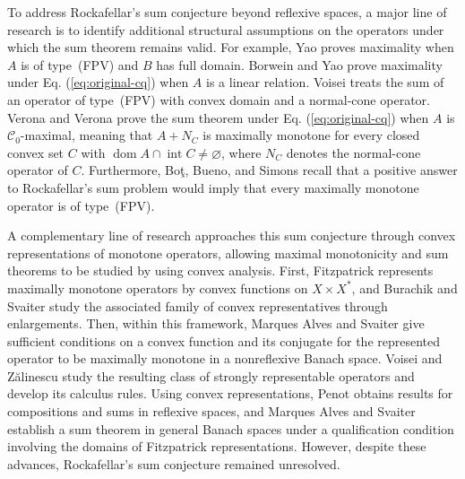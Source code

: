 \documentclass[11pt]{article}
\newcommand{\dom}{\operatorname{dom}}
\theoremstyle{definition}
\theoremstyle{remark}
\begin{document}






To address Rockafellar's sum conjecture beyond reflexive spaces, a major line of research is to identify additional structural assumptions on the operators under which the sum theorem remains valid. 
For example, Yao \cite{yao2010} proves maximality when $A$ is of type~(FPV) and $B$ has full domain. Borwein and Yao \cite{borweinyao2012} prove maximality under Eq. (\ref{eq:original-cq}) when $A$ is a linear relation. Voisei \cite{voisei2010} treats the sum of an operator of type~(FPV) with convex domain and a normal-cone operator. Verona and Verona \cite{veronaverona2022} prove the sum theorem under Eq. (\ref{eq:original-cq}) when $A$ is $\mathcal C_0$-maximal, meaning that  $A+N_C$ is maximally monotone for every closed convex set $C$ with $\dom A\cap\operatorname{int}C\ne\varnothing$, where $N_C$ denotes the normal-cone operator of $C$. 
Furthermore, Bo\c{t}, Bueno, and Simons \cite{botbuenosimons2016} recall that a positive answer to Rockafellar's sum problem would imply that every maximally monotone operator is of type~(FPV). 




A complementary line of research approaches this sum conjecture through convex representations of monotone operators, allowing maximal monotonicity and sum theorems to be studied by using convex analysis. First, Fitzpatrick \cite{fitzpatrick1988} represents maximally monotone operators by convex functions on $X\times X^*$, and Burachik and Svaiter \cite{burachiksvaiter2002} study the associated family of convex representatives through enlargements. Then, within this framework, Marques Alves and Svaiter \cite{marquesalvessvaiter2008br} give sufficient conditions on a convex function and its conjugate for the represented operator to be maximally monotone in a nonreflexive Banach space. Voisei and Z\u{a}linescu \cite{voiseizalinescu2009} study the resulting class of strongly representable operators and develop its calculus rules. Using convex representations, Penot \cite{penot2004} obtains results for compositions and sums in reflexive spaces, and Marques Alves and Svaiter \cite{marquessvaiter2012} establish a sum theorem in general Banach spaces under a qualification condition involving the domains of Fitzpatrick representations. However, despite these advances, Rockafellar's sum conjecture remained unresolved.
\end{document}
